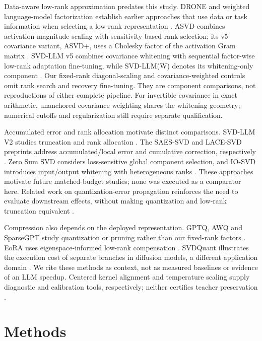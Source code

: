 \documentclass[10pt]{article}
\begin{document}
Data-aware low-rank approximation predates this study. DRONE and weighted language-model factorization establish earlier approaches that use data or task information when selecting a low-rank representation \cite{chen2021drone} \cite{hsu2022weighted}. ASVD combines activation-magnitude scaling with sensitivity-based rank selection; its v5 covariance variant, ASVD+, uses a Cholesky factor of the activation Gram matrix \cite{yuan2023asvd}. SVD-LLM v5 combines covariance whitening with sequential factor-wise low-rank adaptation fine-tuning, while SVD-LLM(W) denotes its whitening-only component \cite{wang2024svdllm}. Our fixed-rank diagonal-scaling and covariance-weighted controls omit rank search and recovery fine-tuning. They are component comparisons, not reproductions of either complete pipeline. For invertible covariance in exact arithmetic, unanchored covariance weighting shares the whitening geometry; numerical cutoffs and regularization still require separate qualification.

Accumulated error and rank allocation motivate distinct comparisons. SVD-LLM V2 studies truncation and rank allocation \cite{wang2025svdllmv2}. The SAES-SVD and LACE-SVD preprints address accumulated/local error and cumulative correction, respectively \cite{hu2026saessvd} \cite{liu2026lacesvd}. Zero Sum SVD considers loss-sensitive global component selection, and IO-SVD introduces input/output whitening with heterogeneous ranks \cite{abbasi2026zerosum} \cite{abbasi2026iosvd}. These approaches motivate future matched-budget studies; none was executed as a comparator here. Related work on quantization-error propagation reinforces the need to evaluate downstream effects, without making quantization and low-rank truncation equivalent \cite{arai2025qep}.

Compression also depends on the deployed representation. GPTQ, AWQ and SparseGPT study quantization or pruning rather than our fixed-rank factors \cite{frantar2022gptq} \cite{lin2023awq} \cite{frantar2023sparsegpt}. EoRA uses eigenspace-informed low-rank compensation \cite{liu2024eora}. SVDQuant illustrates the execution cost of separate branches in diffusion models, a different application domain \cite{li2024svdquant}. We cite these methods as context, not as measured baselines or evidence of an LLM speedup. Centered kernel alignment and temperature scaling supply diagnostic and calibration tools, respectively; neither certifies teacher preservation \cite{kornblith2019cka} \cite{guo2017calibration}.

\section{Methods}
\end{document}
